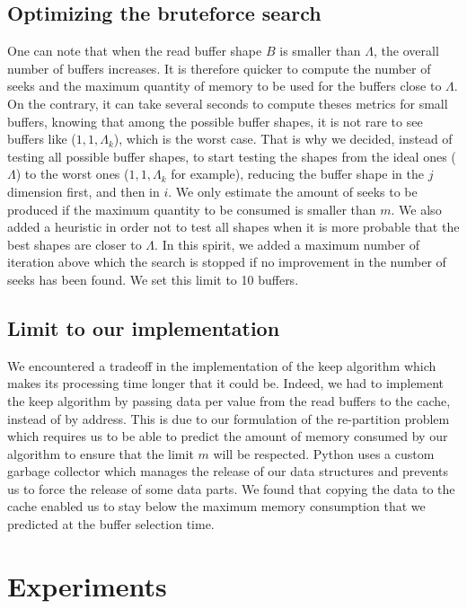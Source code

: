 \documentclass[sigconf, nonacm]{acmart}
\begin{document}
\subsection{Optimizing the bruteforce search}
One can note that when the read buffer shape $B$ is smaller than $\Lambda$,
the overall number of buffers increases.
It is therefore quicker to compute the number of seeks and the maximum
quantity of memory to be used for the buffers close to $\Lambda$.
On the contrary, it can take several seconds to compute theses metrics for
small buffers, knowing that among the possible buffer shapes, it is not rare to
see buffers like ($1,1,\Lambda_k$), which is the worst case.
That is why we decided, instead of testing all possible buffer shapes, to start
testing the shapes from the ideal ones ($\Lambda$) to the worst ones
($1,1,\Lambda_k$ for example), reducing the buffer shape in the $j$ dimension
first, and then in $i$.
We only estimate the amount of seeks to be produced if the maximum quantity
to be consumed is smaller than $m$.
We also added a heuristic in order not to test all shapes when it is more
probable that the best shapes are closer to $\Lambda$.
In this spirit, we added a maximum number of iteration above which the search
is stopped if no improvement in the number of seeks has been found.
We set this limit to 10 buffers.

\subsection{Limit to our implementation}
We encountered a tradeoff in the implementation of the keep algorithm which
makes its processing time longer that it could be.
Indeed, we had to implement the keep algorithm by passing data per value from
the read buffers to the cache, instead of by address.
This is due to our formulation of the re-partition problem which requires us to
be able to predict the amount of memory consumed by our algorithm to ensure that
the limit $m$ will be respected.
Python uses a custom garbage collector which manages the release of our
data structures and prevents us to force the release of some data parts.
We found that copying the data to the cache enabled us to stay below the
maximum memory consumption that we predicted at the buffer selection time.

\section{Experiments}
\label{sec:experiments}
\end{document}
